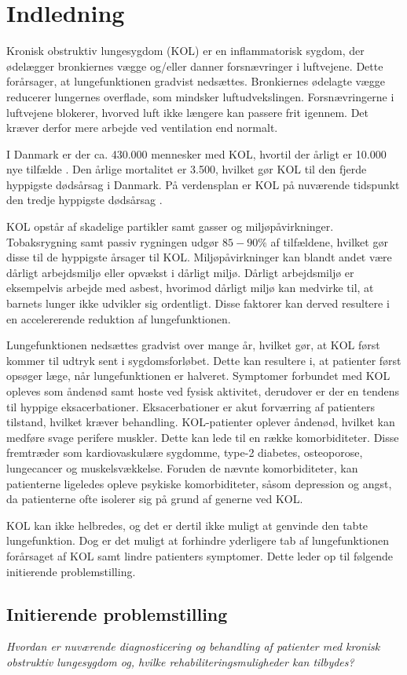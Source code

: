 \chapter{Indledning} 
Kronisk obstruktiv lungesygdom (KOL) er en inflammatorisk sygdom, der ødelægger bronkiernes vægge og/eller danner forsnævringer i luftvejene. Dette forårsager, at lungefunktionen gradvist nedsættes.\cite{Basisbogen2016} Bronkiernes ødelagte vægge reducerer lungernes overflade, som mindsker luftudvekslingen. Forsnævringerne i luftvejene blokerer, hvorved luft ikke længere kan passere frit igennem. Det kræver derfor mere arbejde ved ventilation end normalt.\cite{Lungeforeningen2016}

I Danmark er der ca. 430.000 mennesker med KOL, hvortil der årligt er 10.000 nye tilfælde \cite{Sygdomsbyrden2015}. Den årlige mortalitet er 3.500, hvilket gør KOL til den fjerde hyppigste dødsårsag i Danmark.\cite{Basisbogen2016} På verdensplan er KOL på nuværende tidspunkt den tredje hyppigste dødsårsag \cite{WHO2017}.

KOL opstår af skadelige partikler samt gasser og miljøpåvirkninger. Tobaksrygning samt passiv rygningen udgør $85-90\%$ af tilfældene, hvilket gør disse til de hyppigste årsager til KOL.\cite{Basisbogen2016,Sygdomsbyrden2015,dsam2016,Martinez2016}
Miljøpåvirkninger kan blandt andet være dårligt arbejdsmiljø eller opvækst i dårligt miljø. Dårligt arbejdsmiljø er eksempelvis arbejde med asbest, hvorimod dårligt miljø kan medvirke til, at barnets lunger ikke udvikler sig ordentligt. Disse faktorer kan derved resultere i en accelererende reduktion af lungefunktionen.\cite{Martinez2016}

Lungefunktionen nedsættes gradvist over mange år, hvilket gør, at KOL først kommer til udtryk sent i sygdomsforløbet. Dette kan resultere i, at patienter først opsøger læge, når lungefunktionen er halveret.\cite{dsam2016} Symptomer forbundet med KOL opleves som åndenød samt hoste ved fysisk aktivitet, derudover er der en tendens til hyppige eksacerbationer. Eksacerbationer er akut forværring af patienters tilstand, hvilket kræver behandling.\cite{Basisbogen2016,dsam2016}
KOL-patienter oplever åndenød, hvilket kan medføre svage perifere muskler. Dette kan lede til en række komorbiditeter. Disse fremtræder som kardiovaskulære sygdomme, type-2 diabetes, osteoporose, lungecancer og muskelsvækkelse. Foruden de nævnte komorbiditeter, kan patienterne ligeledes opleve psykiske komorbiditeter, såsom depression og angst, da patienterne ofte isolerer sig på grund af generne ved KOL.\cite{dsam2016}

KOL kan ikke helbredes, og det er dertil ikke muligt at genvinde den tabte lungefunktion. Dog er det muligt at forhindre yderligere tab af lungefunktionen forårsaget af KOL samt lindre patienters symptomer.\cite{Basisbogen2016} Dette leder op til følgende initierende problemstilling.


\section{Initierende problemstilling}
\textit{Hvordan er nuværende diagnosticering og behandling af patienter med kronisk obstruktiv lungesygdom og, hvilke rehabiliteringsmuligheder kan tilbydes?}